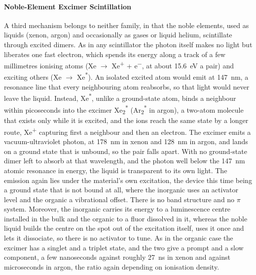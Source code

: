 \paragraph{Noble-Element Excimer Scintillation}
A third mechanism belongs to neither family, in that the noble elements, used as liquids (xenon, argon) and occasionally as gases or liquid helium, scintillate through excited dimers.
As in any scintillator the  photon itself makes no light but liberates one fast electron, which spends its energy along a track of a few millimetres ionising atoms (Xe $\rightarrow$ Xe\textsuperscript{+} + e\textsuperscript{$-$}, at about \qty{15.6}{\electronvolt} a pair) and exciting others (Xe $\rightarrow$ Xe\textsuperscript{*}).
An isolated excited atom would emit at \qty{147}{\nano\metre}, a resonance line that every neighbouring atom reabsorbs, so that light would never leave the liquid.
Instead, Xe\textsuperscript{*}, unlike a ground-state atom, binds a neighbour within picoseconds into the excimer Xe\textsubscript{2}\textsuperscript{*} (Ar\textsubscript{2}\textsuperscript{*} in argon), a two-atom molecule that exists only while it is excited, and the ions reach the same state by a longer route, Xe\textsuperscript{+} capturing first a neighbour and then an electron.
The excimer emits a vacuum-ultraviolet photon, at \qty{178}{\nano\metre} in xenon and \qty{128}{\nano\metre} in argon, and lands on a ground state that is unbound, so the pair falls apart.
With no ground-state dimer left to absorb at that wavelength, and the photon well below the \qty{147}{\nano\metre} atomic resonance in energy, the liquid is transparent to its own light.
The emission again lies under the material's own excitation, the device this time being a ground state that is not bound at all, where the inorganic uses an activator level and the organic a vibrational offset.
There is no band structure and no $\pi$ system.
Moreover, the inorganic carries its energy to a luminescence centre installed in the bulk and the organic to a fluor dissolved in it, whereas the noble liquid builds the centre on the spot out of the excitation itself, uses it once and lets it dissociate, so there is no activator to tune.
As in the organic case the excimer has a singlet and a triplet state, and the two give a prompt and a slow component, a few nanoseconds against roughly \qty{27}{\nano\second} in xenon and against microseconds in argon, the ratio again depending on ionisation density.

